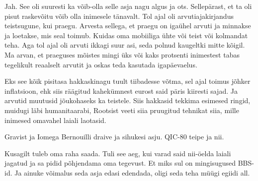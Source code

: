 
Jah. See oli suuresti ka võib-olla selle asja nagu algus ja ots. Sellepärast, et ta oli pisut raskevõitu võib olla inimesele tänavalt. Tol ajal oli arvutiajakirjandus  teistsugune, kui praegu. Arvesta sellega, et praegu on igaühel arvuti ja minnakse ja loetakse, mis seal toimub. Kuidas oma mobiiliga ühte või teist või kolmandat teha. Aga tol ajal oli arvuti ikkagi suur asi, seda polnud kaugeltki mitte kõigil. Ma arvan, et praeguses mõistes mingi üks või kaks protsenti inimestest tabas tegelikult reaalselt arvutit ja oskas teda kasutada igapäevaelus.
                 

Eks see kõik pisitasa hakkaskinagu tuult tiibadesse võtma, sel ajal toimus jõhker inflatsioon, ehk siis räägitud kahekümnest eurost said päris kiiresti sajad. Ja arvutid muutusid jõukohaseks ka teistele. Siis hakkasid tekkima esimesed ringid, muidugi läbi humanitaarabi, Rootsist veeti siia pruugitud tehnikat siia, mille inimesed omavahel laiali laotasid.


Gravist ja Iomega Bernouilli draive ja sihukesi asju. QIC-80 teipe ja nii.


Kusagilt tuleb oma raha saada. Tuli see aeg, kui varad said nii-öelda laiali jagatud ja sa pidid põhjendama oma tegevust. Et miks sul on mingisugused BBS-id. Ja ainuke võimalus seda asja edasi edendada, oligi seda teha müügi egiidi all.

                 
